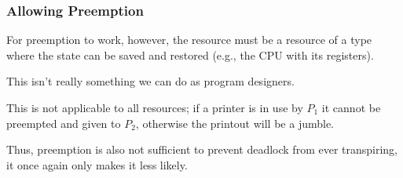 \begin{frame}
	\frametitle{Allowing Preemption}

	For preemption to work, however, the resource must be a resource of a type where the state can be saved and restored (e.g., the CPU with its registers).

	This isn't really something we can do as program designers.

	This is not applicable to all resources; if a printer is in use by $P_{1}$ it cannot be preempted and given to $P_{2}$, otherwise the printout will be a jumble.

	Thus, preemption is also not sufficient to prevent deadlock from ever transpiring, it once again only makes it less likely.



\end{frame}




